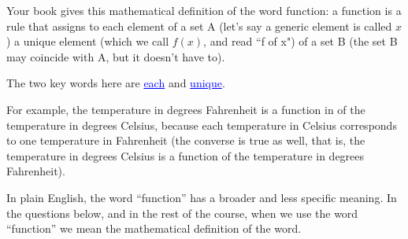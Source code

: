 \documentclass[12pt,dvipsnames]{article}
\begin{document}
Your book gives this mathematical definition of the word function: a function is a rule that assigns to each element of a set A (let's say a generic element is called $x$) a unique element (which we call $f(x)$, and read ``f of x") of a set B (the set B may coincide with A, but it doesn't have to).

The two key words here are {\textcolor{blue}{\underline{each} }} and {\textcolor{blue}{\underline{unique}}}.

For example, the temperature in degrees Fahrenheit is a function in of the temperature in degrees Celsius, because each temperature in 
Celsius corresponds to one temperature in Fahrenheit (the converse is true as well, that is, the temperature in degrees Celsius is a 
function of the temperature in degrees Fahrenheit).

In plain English, the word \enquote{function} has a broader and less specific meaning. In the questions below, and in the rest of the course, when we use the word \enquote{function} we mean the mathematical definition of the word. 
\end{document}
